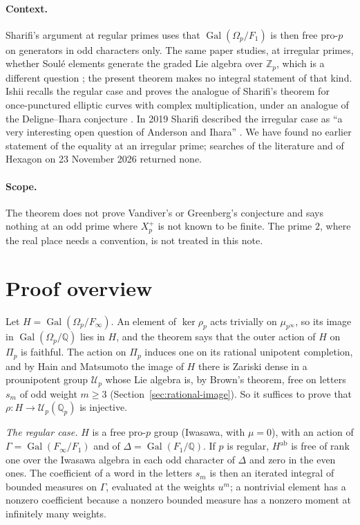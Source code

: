 \documentclass[11pt]{article}
\theoremstyle{definition}
\numberwithin{equation}{section}
\begin{document}
\paragraph{Context.}
Sharifi's argument at regular primes uses that $\operatorname{Gal}(\Omega_p/F_1)$ is then free pro-$p$ on
generators in odd characters only. The same paper studies, at irregular primes, whether Soul\'e elements generate
the graded Lie algebra over $\mathbb Z_p$, which is a different question \cite[Sections 1 and 4]{Sharifi2002};
the present theorem makes no integral statement of that kind. Ishii recalls the regular case and proves the
analogue of Sharifi's theorem for once-punctured elliptic curves with complex multiplication, under an analogue of
the Deligne--Ihara conjecture \cite[Theorem 1.1 and Remark 1.1.1, p.~2]{IshiiKernel2026}. In 2019 Sharifi
described the irregular case as ``a very interesting open question of Anderson and Ihara''
\cite[\S1, p.~222]{Sharifi2019}. We have found no earlier statement of the equality at an irregular prime; searches of the literature and of Hexagon on 23 November 2026
returned none.

\paragraph{Scope.}
The theorem does not prove Vandiver's or Greenberg's conjecture and says nothing at an odd prime where $X_p^+$ is
not known to be finite. The prime $2$, where the real place needs a convention, is not treated in this note.

\section{Proof overview}

Let $H=\operatorname{Gal}(\Omega_p/F_\infty)$. An element of $\ker\rho_p$ acts trivially on $\mu_{p^\infty}$, so
its image in $\operatorname{Gal}(\Omega_p/\mathbb Q)$ lies in $H$, and the theorem says that the outer action of
$H$ on $\Pi_p$ is faithful. The action on $\Pi_p$ induces one on its rational unipotent completion, and by Hain
and Matsumoto the image of $H$ there is Zariski dense in a prounipotent group $\mathcal U_p$ whose Lie algebra is,
by Brown's theorem, free on letters $s_m$ of odd weight $m\ge3$ (Section~\ref{sec:rational-image}). So it suffices
to prove that $\rho:H\to\mathcal U_p(\mathbb Q_p)$ is injective.

\emph{The regular case.} $H$ is a free pro-$p$ group (Iwasawa, with $\mu=0$), with an action of
$\Gamma=\operatorname{Gal}(F_\infty/F_1)$ and of $\Delta=\operatorname{Gal}(F_1/\mathbb Q)$. If $p$ is regular,
$H^{\mathrm{ab}}$ is free of rank one over the Iwasawa algebra in each odd character of $\Delta$ and zero in the
even ones. The coefficient of a word in the letters $s_m$ is then an iterated integral of bounded measures on
$\Gamma$, evaluated at the weights $u^m$; a nontrivial element has a nonzero coefficient because a nonzero bounded
measure has a nonzero moment at infinitely many weights.
\end{document}
